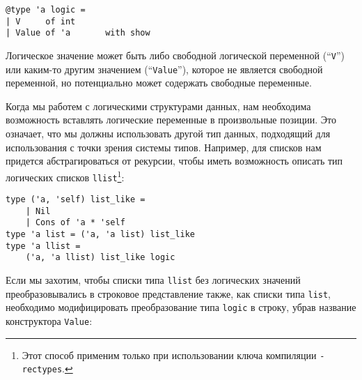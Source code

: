 \begin{lstlisting}
@type 'a logic =
| V     of int
| Value of 'a       with show
\end{lstlisting}
Логическое значение может быть либо свободной логической переменной (``\lstinline{V}'') или каким-то другим значением (``\lstinline{Value}''), которое не является свободной переменной, но потенциально может содержать свободные переменные.
\begin{comment}

Чтобы преобразовывать в и из логических значений, можно воспользоваться следующими функциями:

\begin{lstlisting}
let lift x = Value x

let reify  = function
| V     _ -> invalid_arg "Free variable"
| Value x -> x
\end{lstlisting}

Функция ``\lstinline{reify}'' бросает исключение для свободных переменных, так как в присутствии вхождений свободных переменных
логическое значение нельзя рассматривать как обыкновенную (нелогическую) структуру данных.
\end{comment}


Когда мы работем с логическими структурами данных, нам необходима возможность вставлять логические переменные в произвольные позиции.
Это означает, что мы должны использовать другой тип данных, подходящий для использования 
с точки зрения системы типов. Например,
для списков нам придется абстрагироваться от рекурсии, чтобы иметь возможность описать тип логических списков \lstinline{llist}\footnote{Этот способ применим только при использовании ключа компиляции \texttt{-rectypes}.}:

\begin{lstlisting}
type ('a, 'self) list_like = 
    | Nil 
    | Cons of 'a * 'self
type 'a list = ('a, 'a list) list_like
type 'a llist = 
    ('a, 'a llist) list_like logic
\end{lstlisting}
%

Если мы захотим, чтобы списки типа \lstinline{llist} без логических значений преобразовывались в строковое представление также, как списки типа \lstinline{list}, необходимо модифицировать преобразование типа \lstinline{logic} в строку, убрав название конструктора \lstinline{Value}:

